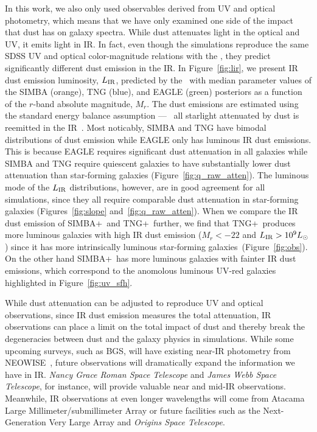 In this work, we also only used observables derived from UV and optical
photometry, which means that we have only examined one side of the impact
that dust has on galaxy spectra.
While dust attenuates light in the optical and UV, it emits light in
IR. In fact, even though the simulations reproduce the same SDSS UV and
optical color-magnitude relations with the \eda, they predict significantly 
different dust emission in the IR. 
In Figure~\ref{fig:lir}, we present IR dust emission luminosity, $L_{\rm
IR}$, predicted by the \eda~with median parameter values of the SIMBA 
(orange), TNG (blue), and EAGLE (green) posteriors as a function of the
$r$-band absolute magnitude, $M_r$.
The dust emissions are estimated using the standard energy balance assumption
--- \ie~all starlight attenuated by dust is reemitted in the IR~\citep{dacunha2008}. 
Most noticably, SIMBA and TNG have bimodal distributions of dust emission
while EAGLE only has luminous IR dust emissions. 
This is because EAGLE requires significant dust attenuation in all
galaxies while SIMBA and TNG require quiescent galaxies to have
substantially lower dust attenuation than star-forming galaxies
(Figure~\ref{fig:q_raw_atten}). 
The luminous mode of the $L_{\rm IR}$ distributions, however, are in good
agreement for all simulations, since they all require comparable dust
attenuation in star-forming galaxies
(Figures~\ref{fig:slope} and~\ref{fig:q_raw_atten}). 
When we compare the IR dust emission of SIMBA+\eda~and TNG+\eda~further, we
find that TNG+\eda~produces more luminous galaxies with high IR dust
emission ($M_r < -22$ and $L_{\rm IR} > 10^9L_\odot$) since it has more
intrinsically luminous star-forming galaxies~(Figure~\ref{fig:obs}).
On the other hand SIMBA+\eda~has more luminous galaxies with fainter IR
dust emissions, which correspond to the anomolous luminous UV-red galaxies
highlighted in Figure~\ref{fig:uv_sfh}.

While dust attenuation can be adjusted to reproduce UV and optical
observations, since IR dust emission measures the total attenuation, IR
observations can place a limit on the total impact of dust and thereby
break the degeneracies between dust and the galaxy physics in simulations.
While some upcoming surveys, such as BGS, will have existing near-IR
photometry from NEOWISE~\citep{meisner2018}, future observations will
dramatically expand the information we have in IR.
\emph{Nancy Grace Roman Space Telescope} and \emph{James Webb Space
Telescope}, for instance, will provide valuable near and
mid-IR observations. 
Meanwhile, IR observations at even longer wavelengths will come from
Atacama Large Millimeter/submillimeter Array or future facilities
such as the Next-Generation Very Large Array and \emph{Origins Space Telescope}.

